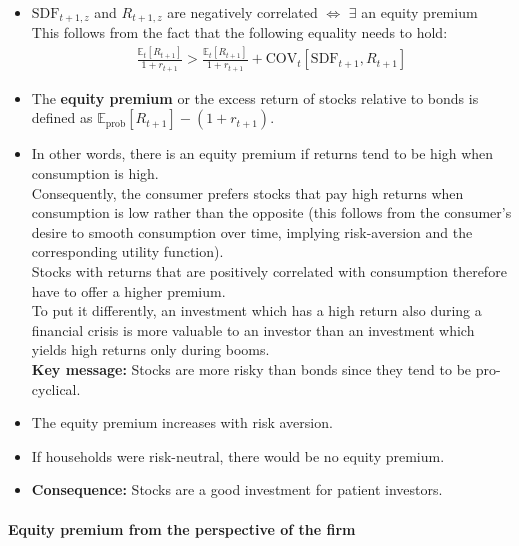 \documentclass[a4paper,landscape,7pt,fleqn]{scrartcl}
\renewcommand{\emph}[1]{\textbf{#1}}
\begin{document}
\begin{multicols*}{3}
\begin{itemize}
\item $\text{SDF}_{t+1,z}$ and $R_{t+1,z}$ are negatively correlated $\iff$ $\exists$ an equity premium \\
This follows from the fact that the following equality needs to hold:
\begin{align*}
\frac{\mathbb{E}_t\left[ R_{t+1} \right]}{1+r_{t+1}} > \frac{\mathbb{E}_t\left[ R_{t+1} \right]}{1+r_{t+1}} + \text{COV}_t \left[ \text{SDF}_{t+1},R_{t+1} \right]
\end{align*}
\item The \emph{equity premium} or the excess return of stocks relative to bonds is defined as $\mathbb{E}_\text{prob} \left[ R_{t+1} \right] - (1+r_{t+1})$.
\item In other words, there is an equity premium if returns tend to be high when consumption is high. \\
Consequently, the consumer prefers stocks that pay high returns when consumption is low rather than the opposite (this follows from the consumer's desire to smooth consumption over time, implying risk-aversion and the corresponding utility function). \\
Stocks with returns that are positively correlated with consumption therefore have to offer a higher premium. \\
To put it differently, an investment which has a high return also during a financial crisis is more valuable to an investor than an investment which yields high returns only during booms. \\
\emph{Key message:} Stocks are more risky than bonds since they tend to be pro-cyclical.
\item The equity premium increases with risk aversion.
\item If households were risk-neutral, there would be no equity premium.
\item \emph{Consequence:} Stocks are a good investment for patient investors.
\end{itemize}

\paragraph{Equity premium from the perspective of the firm}


\end{multicols*}
\end{document}
